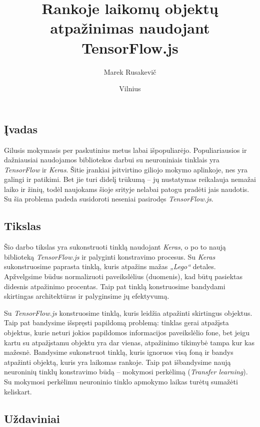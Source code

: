 \documentclass{VUMIFInfKursinis}
\title{Rankoje laikomų objektų atpažinimas naudojant TensorFlow.js}
\author{Marek Rusakevič}
\date{Vilnius \\ \the\year}
\begin{document}
\maketitle

\tableofcontents




\subsection*{Įvadas}
\vspace{10mm}

Gilusis mokymasis per paskutinius metus labai išpopuliarėjo. Populiariausios ir dažniausiai naudojamos bibliotekos darbui su neuroniniais tinklais yra \textit{TensorFlow} ir \textit{Keras}. Šitie įrankiai įsitvirtino giliojo mokymo aplinkoje, nes yra galingi ir patikimi. Bet jie turi didelį trūkumą -- jų nustatymas reikalauja nemažai laiko ir žinių, todėl naujokams šioje srityje nelabai patogu pradėti jais naudotis. Su šia problema padeda susidoroti neseniai pasirodęs \textit{TensorFlow.js}.

\subsection*{Tikslas}

Šio darbo tikslas yra sukonstruoti tinklą naudojant \textit{Keras}, o po to naują biblioteką \textit{TensorFlow.js} ir palyginti konstravimo procesus. Su \textit{Keras} sukonstruosime paprasta tinklą, kuris atpažins mažas \textit{„Lego“} detales. Apžvelgsime būdus normalizuoti paveikslėlius (duomenis), kad būtų pasiektas didesnis atpažinimo procentas. Taip pat tinklą konstruosime bandydami skirtingas architektūras ir palyginsime jų efektyvumą.
\par
Su \textit{TensorFlow.js} konstruosime tinklą, kuris leidžia atpažinti skirtingus objektus. Taip pat bandysime išspręsti papildomą problemą: tinklas gerai atpažįsta objektus, kurie neturi jokios papildomos informacijos paveikslėlio fone, bet jeigu kartu su atpažįstamu objektu yra dar vienas, atpažinimo tikimybė tampa kur kas mažesnė. Bandysime sukonstruot tinklą, kuris ignoruos visą foną ir bandys atpažinti objektą, kuris yra laikomas rankoje. Taip pat išbandysime naują neuroninių tinklų konstravimo būdą -- mokymosi perkėlimą (\textit{Transfer learning}). Su mokymosi perkėlimu neuroninio tinklo apmokymo laikas turėtų sumažėti keliskart.

\subsection*{Uždaviniai}
\end{document}
